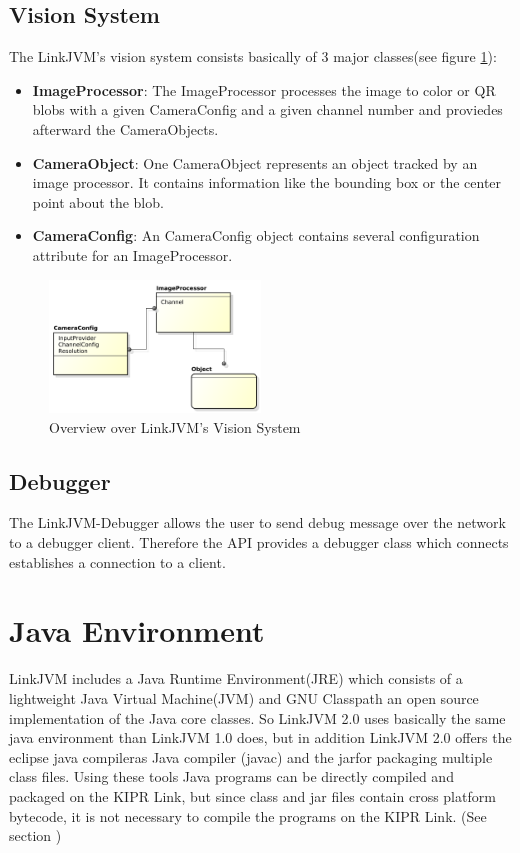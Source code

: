 \documentclass{juniorjournal}
\begin{document}
\subsection{Vision System}
The LinkJVM's vision system consists basically of 3 major classes(see figure \ref{fig:Vision-System}):
\begin{itemize}
	\item {\bf ImageProcessor}: The ImageProcessor processes the image to color or QR blobs with a given CameraConfig and a given channel number and proviedes afterward the CameraObjects. 
	\item {\bf CameraObject}: One CameraObject represents an object tracked by an image processor. It contains information like the bounding box or the center point about the blob.
	\item {\bf CameraConfig}: An CameraConfig object contains several configuration attribute for an ImageProcessor.
\end{itemize}
\begin{figure}[H]
\centering
\includegraphics[width=0.5\textwidth]{images/vision.pdf}
\caption{Overview over LinkJVM's Vision System}
\label{fig:Vision-System}
\end{figure}


\subsection{Debugger}
The LinkJVM-Debugger allows the user to send debug message over the network to a debugger client.
Therefore the API provides a debugger class which connects establishes a connection to a client.


\section{Java Environment}
LinkJVM includes a Java\cite{Java} Runtime Environment(JRE\cite{JRE}) which consists of a lightweight Java\cite{Java} Virtual Machine(JVM\cite{JVM}) and GNU Classpath\cite{GNU} an open source implementation of the Java\cite{Java} core classes.
So LinkJVM 2.0 uses basically the same java environment than LinkJVM 1.0\cite{linkjvm1.0} does, but in addition LinkJVM 2.0 offers the \frqq eclipse java compiler\flqq  as Java compiler (javac) and the \frqq jar\flqq  for packaging multiple class files.
Using these tools Java programs can be directly compiled and packaged on the KIPR Link, but since class and jar files contain cross platform bytecode, it is not necessary to compile the programs on the KIPR Link. (See section )
\end{document}
